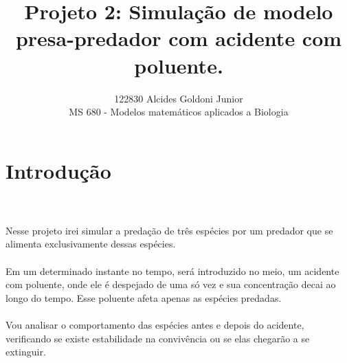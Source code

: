 \documentclass[a4paper]{article}
\title{Projeto 2: Simula\c{c}\~ao de modelo presa-predador com acidente com poluente.}
\author{122830 Alcides Goldoni Junior\\
  \small MS 680 - Modelos matem\'{a}ticos aplicados a Biologia\\
}%
\begin{document}
\maketitle
\section{Introdu\c{c}\~{a}o}
\\
\\
Nesse projeto irei simular a preda\c{c}\~ao de tr\^es esp\'ecies por um predador que se alimenta exclusivamente dessas esp\'ecies.
\\
\\
Em um determinado instante no tempo, ser\'a introduzido no meio, um acidente com poluente, onde ele \'e despejado de uma s\'o vez e sua concentra\c{c}\~ao decai ao longo do tempo. Esse poluente afeta apenas as esp\'ecies predadas.
\\
\\
Vou analisar o comportamento das esp\'ecies antes e depois do acidente, verificando se existe estabilidade na conviv\^encia ou se elas chegar\~ao a se extinguir.
\\
\\
\end{document}
